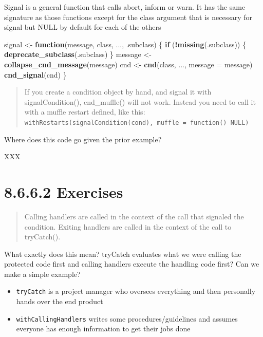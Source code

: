 \documentclass[]{book}
\newenvironment{Shaded}{\begin{snugshade}}{\end{snugshade}}
\newcommand{\ControlFlowTok}[1]{\textcolor[rgb]{0.13,0.29,0.53}{\textbf{#1}}}
\newcommand{\DataTypeTok}[1]{\textcolor[rgb]{0.13,0.29,0.53}{#1}}
\newcommand{\KeywordTok}[1]{\textcolor[rgb]{0.13,0.29,0.53}{\textbf{#1}}}
\newcommand{\NormalTok}[1]{#1}
\newcommand{\OperatorTok}[1]{\textcolor[rgb]{0.81,0.36,0.00}{\textbf{#1}}}
\newcommand{\StringTok}[1]{\textcolor[rgb]{0.31,0.60,0.02}{#1}}
\providecommand{\tightlist}{%
  \setlength{\itemsep}{0pt}\setlength{\parskip}{0pt}}
\begin{document}
Signal is a general function that calls abort, inform or warn. It has the same signature as those functions except for the class argument that is necessary for signal but NULL by default for each of the others

\begin{Shaded}
\begin{Highlighting}[]
\NormalTok{signal <-}\StringTok{ }\ControlFlowTok{function}\NormalTok{(message, class, ..., .subclass) \{}
  \ControlFlowTok{if}\NormalTok{ (}\OperatorTok{!}\KeywordTok{missing}\NormalTok{(.subclass)) \{}
    \KeywordTok{deprecate_subclass}\NormalTok{(.subclass)}
\NormalTok{  \}}
\NormalTok{  message <-}\StringTok{ }\KeywordTok{collapse_cnd_message}\NormalTok{(message)}
\NormalTok{  cnd <-}\StringTok{ }\KeywordTok{cnd}\NormalTok{(class, ..., }\DataTypeTok{message =}\NormalTok{ message)}
  \KeywordTok{cnd_signal}\NormalTok{(cnd)}
\NormalTok{\}}
\end{Highlighting}
\end{Shaded}

\begin{quote}
If you create a condition object by hand, and signal it with signalCondition(), cnd\_muffle() will not work. Instead you need to call it with a muffle restart defined, like this: \texttt{withRestarts(signalCondition(cond),\ muffle\ =\ function()\ NULL)}
\end{quote}

Where does this code go given the prior example?

XXX

\hypertarget{exercises-6}{%
\section*{8.6.6.2 Exercises}\label{exercises-6}}

\begin{quote}
Calling handlers are called in the context of the call that signaled the condition. Exiting handlers are called in the context of the call to tryCatch().
\end{quote}

What exactly does this mean? tryCatch evaluates what we were calling the protected code first and calling handlers execute the handling code first? Can we make a simple example?

\begin{itemize}
\tightlist
\item
  \texttt{tryCatch} is a project manager who oversees everything and then personally hands over the end product
\item
  \texttt{withCallingHandlers} writes some procedures/guidelines and assumes everyone has enough information to get their jobs done
\end{itemize}
\end{document}
